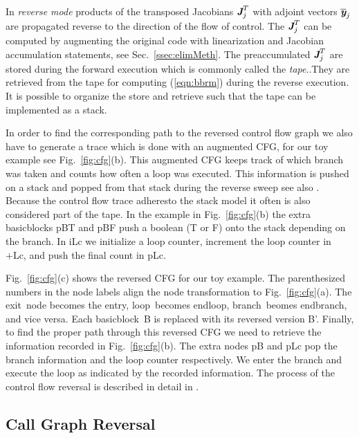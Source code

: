\documentclass[11pt]{article}
\newcommand{\entry}{entry}
\newcommand{\exit}{exit}
\newcommand{\Loop}{loop}
\newcommand{\EndLoop}{endloop}
\newcommand{\branch}{branch}
\newcommand{\EndBranch}{endbranch}
\newcommand{\basicblock}{basicblock}
\newcommand{\bmJ}{\mbox{\bf\em J}}
\newcommand{\bmy}{\mbox{\bf\em y}}
\newcommand{\refsec}[1]{{Sec.~\ref{#1}}}
\newcommand{\reffig}[1]{{Fig.~\ref{#1}}}
\newcommand{\refeqn}[1]{{(\ref{#1})}}
\begin{document}
In {\em reverse mode} products of the transposed
Jacobians $\bmJ^T_j$ with adjoint vectors $\overline{\bmy}_j$
are propagated reverse to the direction of the flow of control.
The $\bmJ^T_j$ can be computed by augmenting the original code with 
linearization and Jacobian accumulation statements, see \refsec{ssec:elimMeth}.
The preaccumulated  $\bmJ^T_j$ are stored during the forward execution
which is commonly called the {\em tape}..They are retrieved from the 
tape for computing \refeqn{eqn:bbrm} during the reverse execution. 
It is possible to organize the store and retrieve such that the tape can be 
implemented as a stack.

In order to find the corresponding path to the reversed control flow graph 
we also have to generate a trace which is done with an augmented CFG,
for our toy example see \reffig{fig:cfg}(b).
This augmented CFG  keeps track of which branch was taken and counts how 
often a loop was 
executed.  
This information is pushed on  a stack and popped from that stack during the 
reverse sweep see also \cite{scam2004}. Because the control flow trace 
adheresto the stack model it often is also considered part of the tape. 
In the example in \reffig{fig:cfg}(b) the extra {\basicblock}s pBT and pBF push 
a boolean (T or F) onto the stack depending on the branch. 
In iLc we initialize a loop counter, increment the loop counter in +Lc, 
and push the final count in pLc. 

\reffig{fig:cfg}(c) shows the reversed CFG for our toy example. 
The parenthesized numbers in the node labels align the 
node transformation to \reffig{fig:cfg}(a). 
The \exit\ node becomes 
the \entry, \Loop\ becomes \EndLoop, \branch\ beomes \EndBranch, and vice versa. 
Each \basicblock\  B is replaced with its reversed version B'.  
Finally, to find the proper path through this reversed CFG we need to retrieve 
the information recorded in  \reffig{fig:cfg}(b). The extra nodes pB and pLc 
pop the branch information and the loop counter respectively.  
We enter the branch and execute the loop as indicated by the recorded information. 
The process of the control flow reversal is described in detail in 
\cite{NULF04CFR}. 

\subsection{Call Graph Reversal} \label{ssec:cgReversal}
\end{document}
